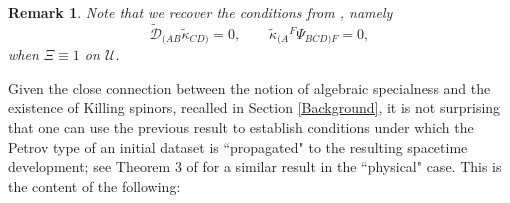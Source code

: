 \documentclass[10pt,a4paper]{article}
\theoremstyle{plain}
\newtheorem{remark}{Remark}
\begin{document}
\begin{remark}{\em 
Note that we recover the conditions from \cite{BaeVal10a}, namely 
\[\tilde{\mathcal{D}}_{(AB}\tilde{\kappa}_{CD)}=0, \qquad \tilde{\kappa}_{(A}{}^F
\Psi_{BCD)F}=0, \]
when $\Xi\equiv  1$ on $\mathcal{U}$. 
}
\end{remark}
Given the close connection between the notion of algebraic specialness and the existence of Killing spinors, recalled in Section \ref{Background}, it is not surprising that one can use the previous result to establish conditions under which the Petrov type of an initial dataset is ``propagated" to the resulting spacetime development; see Theorem 3 of \cite{GarVal08c} for a similar result in the ``physical" case. This is the content of the following:
\end{document}
